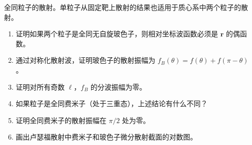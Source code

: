 \begin{question}
全同粒子的散射。单粒子从固定靶上散射的结果也适用于质心系中两个粒子的散射。
\begin{enumerate}
\item 证明如果两个粒子是全同无自旋玻色子，则相对坐标波函数必须是 $\mathbf r$ 的偶函数。
\item 通过对称化散射波，证明玻色子的散射振幅为 $f_B(\theta)=f(\theta)+f(\pi-\theta)$。
\item 证明对所有奇数 $\ell$，$f_B$ 的分波振幅为零。
\item 如果粒子是全同费米子（处于三重态），上述结论有什么不同？
\item 证明全同费米子的散射振幅在 $\pi/2$ 处为零。
\item 画出卢瑟福散射中费米子和玻色子微分散射截面的对数图。
\end{enumerate}
\end{question}
